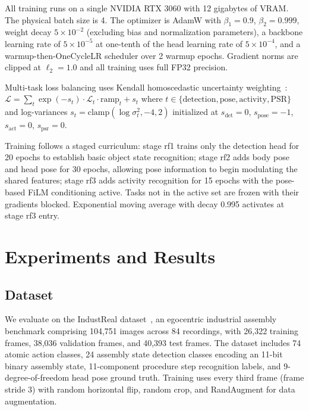 \documentclass[10pt,twocolumn]{article}
\newcommand{\industreal}{IndustReal}
\begin{document}
All training runs on a single NVIDIA RTX 3060 with 12 gigabytes of VRAM. The physical batch size is 4. The optimizer is AdamW with \(\beta_1=0.9\), \(\beta_2=0.999\), weight decay \(5 \times 10^{-2}\) (excluding bias and normalization parameters), a backbone learning rate of \(5 \times 10^{-5}\) at one-tenth of the head learning rate of \(5 \times 10^{-4}\), and a warmup-then-OneCycleLR scheduler over 2 warmup epochs. Gradient norms are clipped at \(\ell_2 = 1.0\) and all training uses full FP32 precision.

Multi-task loss balancing uses Kendall homoscedastic uncertainty weighting~\cite{kendall2018multi}: \(\mathcal{L} = \sum_{t} \exp(-s_t) \cdot \mathcal{L}_t \cdot \text{ramp}_t + s_t\) where \(t \in \{\text{detection}, \text{pose}, \text{activity}, \text{PSR}\}\) and log-variances \(s_t = \text{clamp}(\log \sigma^2_t, -4, 2)\) initialized at \(s_{\text{det}}=0\), \(s_{\text{pose}}=-1\), \(s_{\text{act}}=0\), \(s_{\text{psr}}=0\).

Training follows a staged curriculum: stage rf1 trains only the detection head for 20 epochs to establish basic object state recognition; stage rf2 adds body pose and head pose for 30 epochs, allowing pose information to begin modulating the shared features; stage rf3 adds activity recognition for 15 epochs with the pose-based FiLM conditioning active. Tasks not in the active set are frozen with their gradients blocked. Exponential moving average with decay 0.995 activates at stage rf3 entry.

\section{Experiments and Results}
\label{sec:experiments}

\subsection{Dataset}

We evaluate on the \industreal{} dataset~\cite{schoonbeek2024industreal}, an egocentric industrial assembly benchmark comprising 104,751 images across 84 recordings, with 26,322 training frames, 38,036 validation frames, and 40,393 test frames. The dataset includes 74 atomic action classes, 24 assembly state detection classes encoding an 11-bit binary assembly state, 11-component procedure step recognition labels, and 9-degree-of-freedom head pose ground truth. Training uses every third frame (frame stride 3) with random horizontal flip, random crop, and RandAugment for data augmentation.
\end{document}
